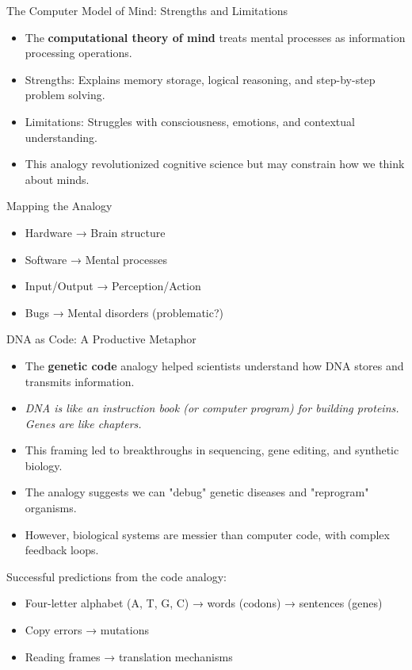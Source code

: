 \documentclass{beamer}
\begin{document}
	
	\begin{frame}{The Computer Model of Mind: Strengths and Limitations}
		\begin{itemize}
			\item The \textbf{computational theory of mind} treats mental processes as information processing operations.
			\item Strengths: Explains memory storage, logical reasoning, and step-by-step problem solving.
			\item Limitations: Struggles with consciousness, emotions, and contextual understanding.
			\item This analogy revolutionized cognitive science but may constrain how we think about minds.
		\end{itemize}
		
		\begin{block}{Mapping the Analogy}
			\begin{itemize}
				\item Hardware → Brain structure
				\item Software → Mental processes
				\item Input/Output → Perception/Action
				\item Bugs → Mental disorders (problematic?)
			\end{itemize}
		\end{block}
	\end{frame}
	
	\begin{frame}{DNA as Code: A Productive Metaphor}
		\begin{itemize}
			\item The \textbf{genetic code} analogy helped scientists understand how DNA stores and transmits information.
			\item \textit{DNA is like an instruction book (or computer program) for building proteins. Genes are like chapters.}
			\item This framing led to breakthroughs in sequencing, gene editing, and synthetic biology.
			\item The analogy suggests we can "debug" genetic diseases and "reprogram" organisms.
			\item However, biological systems are messier than computer code, with complex feedback loops.
		\end{itemize}
		
		\begin{example}
			\scriptsize
			Successful predictions from the code analogy:
			\begin{itemize}
				\item Four-letter alphabet (A, T, G, C) → words (codons) → sentences (genes)
				\item Copy errors → mutations
				\item Reading frames → translation mechanisms
			\end{itemize}
		\end{example}
	\end{frame}
	
\end{document}
